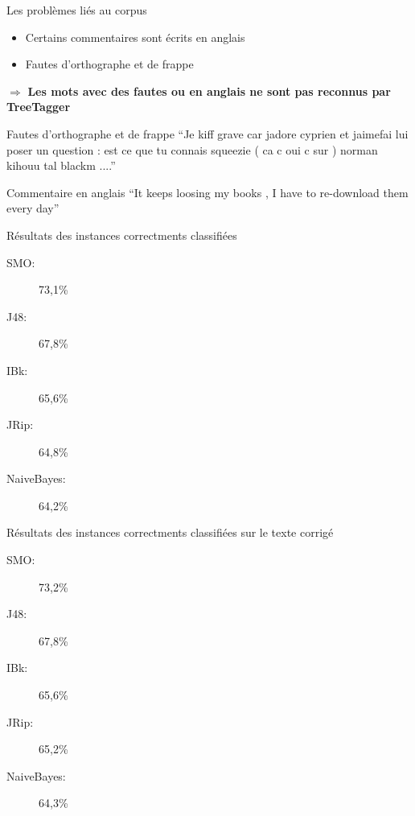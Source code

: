 \documentclass{beamer}
\begin{document}
\begin{frame}
	\begin{block}{Les problèmes liés au corpus}
		\begin{itemize}
			\item Certains commentaires sont écrits en anglais
			\item Fautes d'orthographe et de frappe
		\end{itemize}
		
		\vspace{0.5cm}
		
		$\Rightarrow$ \textbf{Les mots avec des fautes ou en anglais ne sont pas reconnus par TreeTagger}
	\end{block}
\end{frame}

\begin{frame}
	\begin{exampleblock}{Fautes d'orthographe et de frappe}
		``Je kiff grave car jadore cyprien et jaimefai lui poser un question : est ce que tu connais squeezie ( ca c oui c sur ) norman kihouu tal blackm ....''\\
		
	\end{exampleblock}
	
	\begin{exampleblock}{Commentaire en anglais}
		``It keeps loosing my books , I have to re-download them every day''
	\end{exampleblock}

\end{frame}

\begin{frame}
	\begin{block}{Résultats des instances correctments classifiées}
		\begin{description}
			\item[SMO: ]73,1\%
			\item[J48: ]67,8\%
			\item[IBk: ]65,6\%
			\item[JRip: ]64,8\%
			\item[NaiveBayes: ]64,2\%
		\end{description}	
	\end{block}
\end{frame}

\begin{frame}
	\begin{block}{Résultats des instances correctments classifiées sur le texte corrigé}
		\begin{description}
			\item[SMO: ]73,2\%
			\item[J48: ]67,8\%
			\item[IBk: ]65,6\%
			\item[JRip: ]65,2\%
			\item[NaiveBayes: ]64,3\%
		\end{description}	
	\end{block}
\end{frame}
\end{document}
